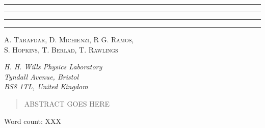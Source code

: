 \begin{titlepage}
    \begin{center}
            
        \vspace*{\baselineskip}

        \rule{\textwidth}{1.6pt}\vspace*{-\baselineskip}\vspace*{2pt} %
	    \rule{\textwidth}{0.4pt} %

        \vspace{1.5\baselineskip}


        \vspace{0.75\baselineskip} %
	
        \rule{\textwidth}{0.4pt}\vspace*{-\baselineskip}\vspace{3.2pt} %
        \rule{\textwidth}{1.6pt} %
        
        \vspace{1.5\baselineskip}

        \textsc{\Large A. Tarafdar, D. Michienzi, R G. Ramos, \\ \vspace{0.1cm}S. Hopkins, T. Berlad, T. Rawlings}

        \vspace{0.5cm}
        \textit{H. H. Wills Physics Laboratory \\ Tyndall Avenue, Bristol \\ BS8 1TL, United Kingdom}

        \vspace{0.5cm}
        \begin{abstract}
            ABSTRACT GOES HERE
        \end{abstract}
        \vspace{9mm}
   
   

    \end{center}
    \begin{flushright}
    {\small Word count: XXX}
    \end{flushright}
    
\end{titlepage}